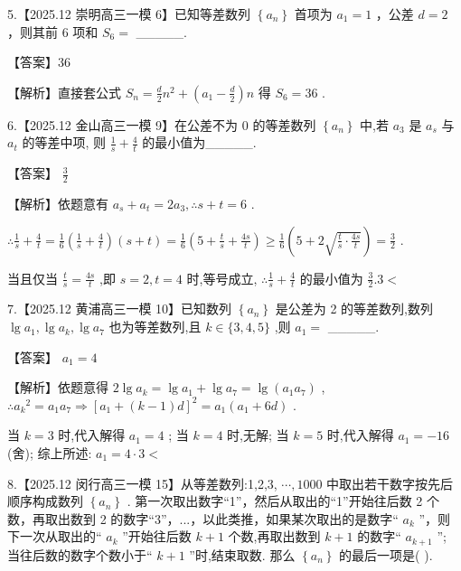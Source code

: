 \documentclass[10pt]{article}
\begin{document}
5.【2025.12 崇明高三一模 6】已知等差数列 \(\left\{  {a}_{n}\right\}\) 首项为 \({a}_{1} = 1\) ，公差 \(d = 2\) ，则其前 6 项和 \({S}_{6} =\) \_\_\_\_\_.

【答案】36

【解析】直接套公式 \({S}_{n} = \frac{d}{2}{n}^{2} + \left( {{a}_{1} - \frac{d}{2}}\right) n\) 得 \({S}_{6} = {36}\) .

6.【2025.12 金山高三一模 9】在公差不为 0 的等差数列 \(\left\{  {a}_{n}\right\}\) 中,若 \({a}_{3}\) 是 \({a}_{s}\) 与 \({a}_{t}\) 的等差中项, 则 \(\frac{1}{s} + \frac{4}{t}\) 的最小值为\_\_\_\_\_.

【答案】 \(\frac{3}{2}\)

【解析】依题意有 \({a}_{s} + {a}_{t} = 2{a}_{3},\therefore s + t = 6\) .

\(\therefore \frac{1}{s} + \frac{4}{t} = \frac{1}{6}\left( {\frac{1}{s} + \frac{4}{t}}\right) \left( {s + t}\right)  = \frac{1}{6}\left( {5 + \frac{t}{s} + \frac{4s}{t}}\right)  \geq  \frac{1}{6}\left( {5 + 2\sqrt{\frac{t}{s} \cdot  \frac{4s}{t}}}\right)  = \frac{3}{2}\) .

当且仅当 \(\frac{t}{s} = \frac{4s}{t}\) ,即 \(s = 2,t = 4\) 时,等号成立, \(\therefore \frac{1}{s} + \frac{4}{t}\) 的最小值为 \(\frac{3}{2}.3 <\)

7.【2025.12 黄浦高三一模 10】已知数列 \(\left\{  {a}_{n}\right\}\) 是公差为 2 的等差数列,数列 \(\lg {a}_{1},\lg {a}_{k},\lg {a}_{7}\) 也为等差数列,且 \(k \in  \{ 3,4,5\}\) ,则 \({a}_{1} =\) \_\_\_\_\_.

【答案】 \({a}_{1} = 4\)

【解析】依题意得 \(2\lg {a}_{k} = \lg {a}_{1} + \lg {a}_{7} = \lg \left( {{a}_{1}{a}_{7}}\right)\) , \(\therefore {a}_{k}{}^{2} = {a}_{1}{a}_{7} \Rightarrow  {\left\lbrack  {a}_{1} + \left( k - 1\right) d\right\rbrack  }^{2} = {a}_{1}\left( {{a}_{1} + {6d}}\right)\) .

当 \(k = 3\) 时,代入解得 \({a}_{1} = 4\) ; 当 \(k = 4\) 时,无解; 当 \(k = 5\) 时,代入解得 \({a}_{1} =  - {16}\) (舍); 综上所述: \({a}_{1} = 4 \cdot  3 <\)

8.【2025.12 闵行高三一模 15】从等差数列:1,2,3, \(\cdots ,{1000}\) 中取出若干数字按先后顺序构成数列 \(\left\{  {a}_{n}\right\}\) . 第一次取出数字“1”，然后从取出的“1”开始往后数 2 个数，再取出数到 2 的数字“3”，...，以此类推，如果某次取出的是数字“ \({a}_{k}\) ”，则下一次从取出的“ \({a}_{k}\) ”开始往后数 \(k + 1\) 个数,再取出数到 \(k + 1\) 的数字“ \({a}_{k + 1}\) ”; 当往后数的数字个数小于“ \(k + 1\) ”时,结束取数. 那么 \(\left\{  {a}_{n}\right\}\) 的最后一项是( ).
\end{document}
